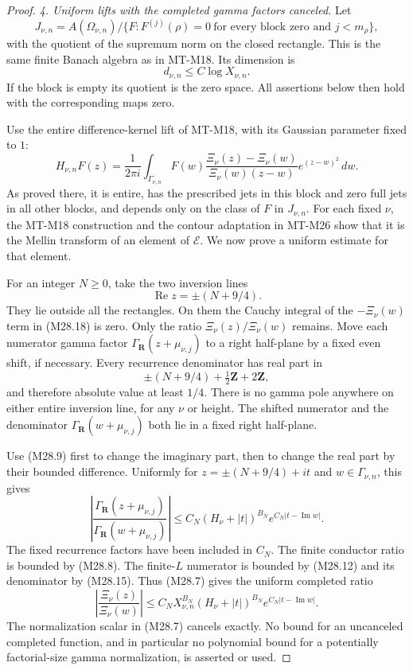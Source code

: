 \begin{proof}
\emph{4. Uniform lifts with the completed gamma factors canceled.}
Let
\[
 J_{\nu,n}=A(\Omega_{\nu,n})/
       \{F:F^{(j)}(\rho)=0\
             \text{for every block zero and }j<m_\rho\},
                                                               \tag{M28.16}
\]
with the quotient of the supremum norm on the
closed rectangle. This is the same finite
Banach algebra as in MT-M18. Its dimension is
\[
                  d_{\nu,n}\le C\log X_{\nu,n}.                \tag{M28.17}
\]
If the block is empty its quotient is the zero
space. All assertions below then hold with
the corresponding maps zero.

Use the entire difference-kernel lift of MT-M18,
with its Gaussian parameter fixed to \(1\):
\[
 H_{\nu,n}F(z)=\frac1{2\pi i}
       \int_{\Gamma_{\nu,n}}
       F(w)\frac{\Xi_\nu(z)-\Xi_\nu(w)}
                    {\Xi_\nu(w)(z-w)}
                         e^{(z-w)^2}\,dw.                    \tag{M28.18}
\]
As proved there, it is entire, has the prescribed
jets in this block and zero full jets in all
other blocks, and depends only on the class of
\(F\) in \(J_{\nu,n}\). For each fixed \(\nu\),
the MT-M18 construction and the contour
adaptation in MT-M26 show that it is the
Mellin transform of an element of \(\mathcal E\).
We now prove a uniform estimate for that element.

For an integer \(N\ge0\), take the two inversion
lines
\[
                 \operatorname{Re}z=\pm(N+9/4).              \tag{M28.19}
\]
They lie outside all the rectangles. On them the
Cauchy integral of the \(-\Xi_\nu(w)\) term in
(M28.18) is zero. Only the ratio
\(\Xi_\nu(z)/\Xi_\nu(w)\) remains.
Move each numerator gamma factor
\(\Gamma_{\mathbf R}(z+\mu_{\nu,j})\) to a right
half-plane by a fixed even shift, if necessary.
Every recurrence denominator has real part in
\[
        \pm(N+9/4)+\tfrac12\mathbf Z+2\mathbf Z,
 \]
and therefore absolute value at least \(1/4\).
There is no gamma pole anywhere on either
entire inversion line, for any \(\nu\) or height.
The shifted numerator and the denominator
\(\Gamma_{\mathbf R}(w+\mu_{\nu,j})\) both lie
in a fixed right half-plane.

Use (M28.9) first to change the imaginary part,
then to change the real part by their bounded
difference. Uniformly for \(z=\pm(N+9/4)+it\)
and \(w\in\Gamma_{\nu,n}\), this gives
\[
 \left|
  \frac{\Gamma_{\mathbf R}(z+\mu_{\nu,j})}
       {\Gamma_{\mathbf R}(w+\mu_{\nu,j})}
 \right|
 \le C_N(H_\nu+|t|)^{B_N}
                      e^{C_N|t-\operatorname{Im}w|}.         \tag{M28.20}
\]
The fixed recurrence factors have been included
in \(C_N\). The finite conductor ratio is bounded
by (M28.8). The finite-\(L\) numerator is bounded
by (M28.12) and its denominator by (M28.15).
Thus (M28.7) gives the uniform completed ratio
\[
 \left|\frac{\Xi_\nu(z)}{\Xi_\nu(w)}\right|
 \le C_N X_{\nu,n}^{B_N}
            (H_\nu+|t|)^{B_N}
                      e^{C_N|t-\operatorname{Im}w|}.         \tag{M28.21}
\]
The normalization scalar in (M28.7) cancels
exactly. No bound for an uncanceled completed
function, and in particular no polynomial
bound for a potentially factorial-size gamma
normalization, is asserted or used.


\end{proof}
